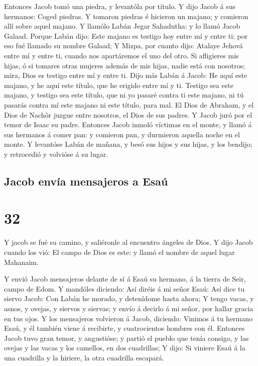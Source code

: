  Entonces Jacob tomó una piedra, y levantóla por título.
 Y dijo Jacob á sus hermanos: Coged piedras. Y tomaron
piedras é hicieron un majano; y comieron allí sobre aquel majano.
 Y llamólo Labán Jegar Sahadutha: y lo llamó Jacob Galaad.
 Porque Labán dijo: Este majano es testigo hoy entre mí y
entre ti; por eso fué llamado su nombre Galaad;  Y Mizpa,
por cuanto dijo: Atalaye Jehová entre mí y entre ti, cuando nos
apartáremos el uno del otro.  Si afligieres mis hijas, ó si
tomares otras mujeres además de mis hijas, nadie está con nosotros;
mira, Dios es testigo entre mí y entre ti.  Dijo más Labán
á Jacob: He aquí este majano, y he aquí este título, que he erigido
entre mí y ti.  Testigo sea este majano, y testigo sea este
título, que ni yo pasaré contra ti este majano, ni tú pasarás contra mí
este majano ni este título, para mal.  El Dios de Abraham,
y el Dios de Nachôr juzgue entre nosotros, el Dios de sus padres. Y
Jacob juró por el temor de Isaac su padre.  Entonces Jacob
inmoló víctimas en el monte, y llamó á sus hermanos á comer pan: y
comieron pan, y durmieron aquella noche en el monte.  Y
levantóse Labán de mañana, y besó sus hijos y sus hijas, y los bendijo;
y retrocedió y volvióse á su lugar.

\hypertarget{jacob-envuxeda-mensajeros-a-esauxfa}{%
\subsection{Jacob envía mensajeros a
Esaú}\label{jacob-envuxeda-mensajeros-a-esauxfa}}

\hypertarget{section-31}{%
\section{32}\label{section-31}}

 Y jacob se fué su camino, y saliéronle al encuentro ángeles
de Dios.  Y dijo Jacob cuando los vió: El campo de Dios es
este: y llamó el nombre de aquel lugar Mahanaim.

 Y envió Jacob mensajeros delante de sí á Esaú su hermano, á
la tierra de Seir, campo de Edom.  Y mandóles diciendo: Así
diréis á mi señor Esaú: Así dice tu siervo Jacob: Con Labán he morado, y
detenídome hasta ahora;  Y tengo vacas, y asnos, y ovejas, y
siervos y siervas; y envío á decirlo á mi señor, por hallar gracia en
tus ojos.  Y los mensajeros volvieron á Jacob, diciendo:
Vinimos á tu hermano Esaú, y él también viene á recibirte, y
cuatrocientos hombres con él.  Entonces Jacob tuvo gran
temor, y angustióse; y partió el pueblo que tenía consigo, y las ovejas
y las vacas y los camellos, en dos cuadrillas;  Y dijo: Si
viniere Esaú á la una cuadrilla y la hiriere, la otra cuadrilla
escapará.

